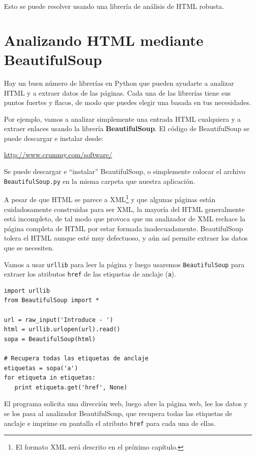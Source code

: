 Esto se puede resolver usando una librería de análisis de HTML robusta.

\section{Analizando HTML mediante BeautifulSoup}

Hay un buen número de librerías en Python que pueden ayudarte a analizar
HTML y a extraer datos de las páginas. Cada una de las librerías
tiene sus puntos fuertes y flacos, de modo que puedes elegir una
basada en tus necesidades.

Por ejemplo, vamos a analizar simplemente una entrada HTML cualquiera
y a extraer enlaces usando la librería {\bf BeautifulSoup}.
El código de BeautifulSoup se puede descargar e instalar
desde:

\url{http://www.crummy.com/software/}

Se puede descargar e ``instalar'' BeautifulSoup, o
simplemente colocar el archivo {\tt BeautifulSoup.py} en la
misma carpeta que nuestra aplicación.

A pesar de que HTML se parece a XML\footnote{El formato XML será descrito
en el próximo capítulo.} y que algunas páginas están cuidadosamente
construidas para ser XML, la mayoría del HTML generalmente está
incompleto, de tal modo que provoca que un analizador de XML rechace la página completa de HTML
por estar formada inadecuadamente. BeautifulSoup tolera el HTML
aunque esté muy defectuoso, y aún así permite extraer los datos que se necesiten.

Vamos a usar {\tt urllib} para leer la página y luego usaremos
{\tt BeautifulSoup} para extraer los atributos {\tt href} de las
etiquetas de anclaje ({\tt a}).

\beforeverb
\begin{verbatim}
import urllib
from BeautifulSoup import *

url = raw_input('Introduce - ')
html = urllib.urlopen(url).read()
sopa = BeautifulSoup(html)

# Recupera todas las etiquetas de anclaje
etiquetas = sopa('a')
for etiqueta in etiquetas:
   print etiqueta.get('href', None)
\end{verbatim}
\afterverb
%
El programa solicita una dirección web, luego abre la página
web, lee los datos y se los pasa al analizador BeautifulSoup,
que recupera todas las etiquetas de anclaje e imprime en pantalla
el atributo {\tt href} para cada una de ellas.

